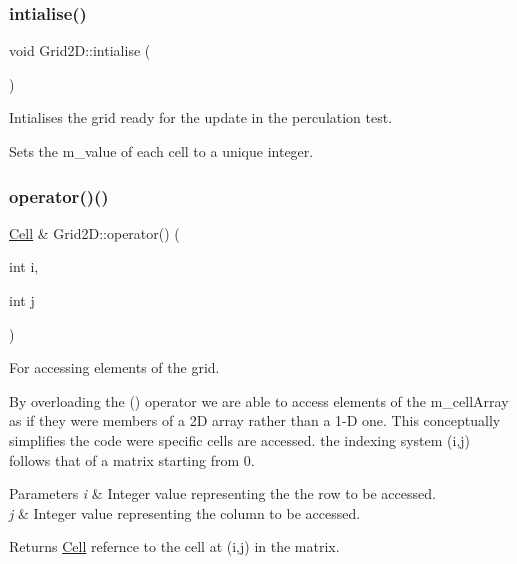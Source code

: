 \subsubsection{\texorpdfstring{intialise()}{intialise()}}
{\footnotesize\ttfamily void Grid2\+D\+::intialise (\begin{DoxyParamCaption}{ }\end{DoxyParamCaption})}



Intialises the grid ready for the update in the perculation test. 

Sets the m\+\_\+value of each cell to a unique integer. \mbox{\label{class_grid2_d_a88d8929972ecb8ffcb693bf2ed81aff0}} 
\subsubsection{\texorpdfstring{operator()()}{operator()()}\hspace{0.1cm}{\footnotesize\ttfamily [1/2]}}
{\footnotesize\ttfamily \hyperlink{class_cell}{Cell} \& Grid2\+D\+::operator() (\begin{DoxyParamCaption}\item[{int}]{i,  }\item[{int}]{j }\end{DoxyParamCaption})}



For accessing elements of the grid. 

By overloading the () operator we are able to access elements of the m\+\_\+cell\+Array as if they were members of a 2D array rather than a 1-\/D one. This conceptually simplifies the code were specific cells are accessed. the indexing system (i,j) follows that of a matrix starting from 0.


\begin{DoxyParams}{Parameters}
{\em i} & Integer value representing the the row to be accessed.\\
\hline
{\em j} & Integer value representing the column to be accessed.\\
\hline
\end{DoxyParams}
\begin{DoxyReturn}{Returns}
\hyperlink{class_cell}{Cell} refernce to the cell at (i,j) in the matrix. 
\end{DoxyReturn}
\mbox{\label{class_grid2_d_a48c234358065a78d99724bba59c35075}} 
